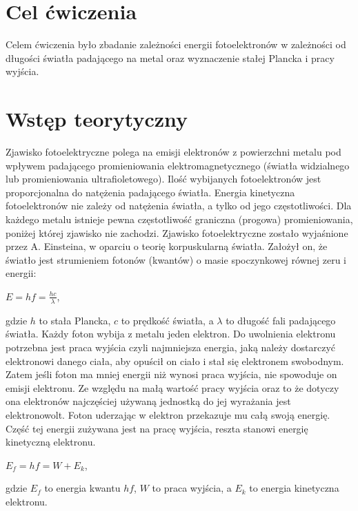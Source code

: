 \documentclass[12pt]{article}
\begin{document}
\tableofcontents \newpage
\section{Cel ćwiczenia}
Celem ćwiczenia było zbadanie zależności energii fotoelektronów w zależności od długości światła padającego na metal oraz wyznaczenie stałej Plancka i pracy wyjścia.
\section{Wstęp teorytyczny}
Zjawisko fotoelektryczne polega na emisji elektronów z powierzchni metalu pod wpływem padającego promieniowania elektromagnetycznego (światła widzialnego lub promieniowania ultrafioletowego). Ilość wybijanych fotoelektronów jest proporcjonalna do natężenia padającego światła. Energia kinetyczna fotoelektronów nie zależy od natężenia światła, a tylko od jego częstotliwości. Dla każdego metalu istnieje pewna częstotliwość graniczna (progowa) promieniowania, poniżej której zjawisko nie zachodzi. \newline
Zjawisko fotoelektryczne zostało wyjaśnione przez A. Einsteina, w oparciu o teorię korpuskularną światła. Założył on, że światło jest strumieniem fotonów (kwantów) o masie spoczynkowej równej zeru i energii:
\begin{center}
\Large $E=hf=\frac{hc}{\lambda}$,
\end{center}
gdzie $h$ to stała Plancka, $c$ to prędkość światła, a $\lambda$ to długość fali padającego światła. \newline
Każdy foton wybija z metalu jeden elektron. Do uwolnienia elektronu potrzebna jest praca wyjścia czyli najmniejsza energia, jaką należy dostarczyć elektronowi danego ciała, aby opuścił on ciało i stał się elektronem swobodnym. \newline
Zatem jeśli foton ma mniej energii niż wynosi praca wyjścia, nie spowoduje on emisji elektronu. Ze względu na małą wartość pracy wyjścia oraz to że dotyczy ona elektronów najczęściej używaną jednostką do jej wyrażania jest elektronowolt. \newline
Foton uderzając w elektron przekazuje mu całą swoją energię. Część tej energii zużywana jest na pracę wyjścia, reszta stanowi energię kinetyczną elektronu.
\begin{center}
\Large $E_f=hf=W+E_k$,
\end{center}
gdzie $E_f$ to energia kwantu $hf$, $W$ to praca wyjścia, a $E_k$ to energia kinetyczna elektronu. \newline
\end{document}
